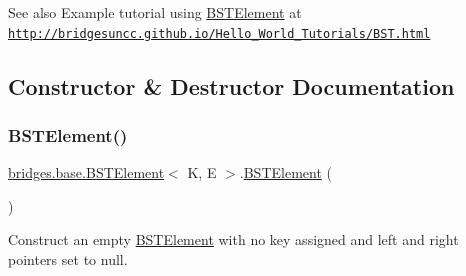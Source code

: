 \begin{DoxySeeAlso}{See also}
Example tutorial using \mbox{\hyperlink{classbridges_1_1base_1_1_b_s_t_element}{B\+S\+T\+Element}} at ~\newline
 \href{http://bridgesuncc.github.io/Hello_World_Tutorials/BST.html}{\tt http\+://bridgesuncc.\+github.\+io/\+Hello\+\_\+\+World\+\_\+\+Tutorials/\+B\+S\+T.\+html} 
\end{DoxySeeAlso}


\subsection{Constructor \& Destructor Documentation}
\mbox{\label{classbridges_1_1base_1_1_b_s_t_element_a5a557bf3e29e2936c244147c69e04795}} 
\subsubsection{\texorpdfstring{B\+S\+T\+Element()}{BSTElement()}\hspace{0.1cm}{\footnotesize\ttfamily [1/8]}}
{\footnotesize\ttfamily \mbox{\hyperlink{classbridges_1_1base_1_1_b_s_t_element}{bridges.\+base.\+B\+S\+T\+Element}}$<$ K, E $>$.\mbox{\hyperlink{classbridges_1_1base_1_1_b_s_t_element}{B\+S\+T\+Element}} (\begin{DoxyParamCaption}{ }\end{DoxyParamCaption})}

Construct an empty \mbox{\hyperlink{classbridges_1_1base_1_1_b_s_t_element}{B\+S\+T\+Element}} with no key assigned and left and right pointers set to null. \mbox{\label{classbridges_1_1base_1_1_b_s_t_element_a0ec94ad6e2313ada05b48eb83a2f31cb}} 
